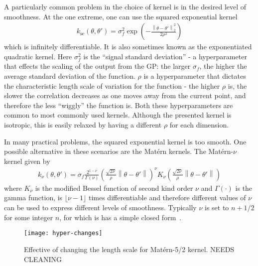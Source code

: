 A particularly common problem in the choice of kernel is in the desired level
of smoothness.  At the one extreme, one can use the squared exponential kernel
\begin{align}
\label{eq:opt:se-kernel}
k_{\mathrm{se}} \left(\theta,\theta'\right) = \sigma_f^2 \exp \left(-\frac{\left\lVert \theta - \theta'\right\rVert^2_2}{2 \rho^2}\right)
\end{align}
which is infinitely differentiable.  It is also sometimes known as
the exponentiated quadratic kernel. Here $\sigma_f^2$ is the ``signal 
standard deviation'' - a hyperparameter that
effects the scaling of the output from the GP: the larger $\sigma_f$, the higher
the average standard deviation of the function.  $\rho$ is a hyperparameter
that dictates the characteristic length scale of variation for the function - the
higher $\rho$ is, the slower the correlation decreases as one moves away from the
current point, and therefore the less ``wiggly'' the function is.  Both these
hyperparameters are common to most commonly used kernels.  Although the
presented kernel is isotropic, this is easily relaxed by having a different $\rho$
for each dimension.

In many practical problems, the squared exponential kernel is too smooth.
One possible alternative in these scenarios are the Mat\'{e}rn kernels.  The
Mat\'{e}rn-$\nu$ kernel given by
\begin{align}
k_{\nu}\left(\theta,\theta'\right) = \sigma_f \frac{2^{1-\nu}}{\Gamma\left(\nu\right)}\left(\frac{\sqrt{2\nu}}{\rho}\left\lVert\theta-\theta'\right\rVert\right)^{\nu} K_\nu
 \left(\frac{\sqrt{2\nu}}{\rho}\left\lVert\theta-\theta'\right\rVert\right)
\end{align}
where $K_{\nu}$ is the modified Bessel function of second kind order $\nu$
and $\Gamma(\cdot)$ is the gamma function,
is $\lfloor\nu-1\rfloor$ times differentiable and
therefore different values of $\nu$ can be used to express different levels
of smoothness.  Typically $\nu$ is set to $n+1/2$ for some integer $n$, for
which is has a simple closed form~\cite{rasmussen2006gaussian}.

\begin{figure}[t]
	\centering
	\texttt{[image: hyper-changes]}
	\caption{Effective of changing the length scale for Mat\'{e}rn-5/2 kernel. NEEDS CLEANING \label{fig:opt:hyper-changes}}
\end{figure}

